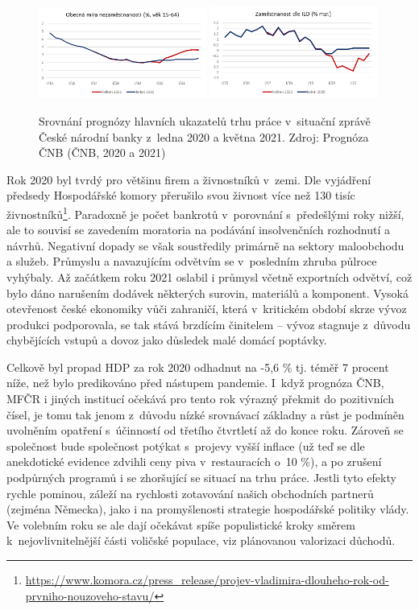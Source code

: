 \begin{figure}[ht]
    \centering
    \includegraphics[width=0.49\textwidth]{./pic/nezamestnanost.png} \includegraphics[width=0.49\textwidth]{./pic/zamestnanost.png}
    \caption{Srovnání prognózy hlavních ukazatelů trhu práce v~situační zprávě České národní banky z~ledna 2020 a května 2021. Zdroj: Prognóza ČNB (ČNB, 2020 a 2021)}
    \label{fig:110-trhprace}
\end{figure}

Rok 2020 byl tvrdý pro většinu firem a živnostníků v~zemi. Dle vyjádření předsedy Hospodářské komory přerušilo svou živnost více než 130 tisíc živnostníků\footnote{\url{https://www.komora.cz/press_release/projev-vladimira-dlouheho-rok-od-prvniho-nouzoveho-stavu/}}. Paradoxně je počet bankrotů v~porovnání s~předešlými roky nižší, ale to souvisí se zavedením moratoria na podávání insolvenčních rozhodnutí a návrhů. Negativní dopady se však soustředily primárně na sektory maloobchodu a služeb. Průmyslu a navazujícím odvětvím se v~posledním zhruba půlroce vyhýbaly. Až začátkem roku 2021 oslabil i průmysl včetně exportních odvětví, což bylo dáno narušením dodávek některých surovin, materiálů a komponent. Vysoká otevřenost české ekonomiky vůči zahraničí, která v~kritickém období skrze vývoz produkci podporovala, se tak stává brzdícím činitelem – vývoz stagnuje z~důvodu chybějících vstupů a dovoz jako důsledek malé domácí poptávky.

Celkově byl propad HDP za rok 2020 odhadnut na -5,6 \% tj. téměř 7 procent níže, než bylo predikováno před nástupem pandemie. I~když prognóza ČNB, MFČR i jiných institucí očekává pro tento rok výrazný překmit do pozitivních čísel, je tomu tak jenom z~důvodu nízké srovnávací základny a růst je podmíněn uvolněním opatření s~účinností od třetího čtvrtletí až do konce roku. Zároveň se společnost bude společnost potýkat s~projevy vyšší inflace (už teď se dle anekdotické evidence zdvihli ceny piva v~restauracích o~10 \%), a po zrušení podpůrných programů i se zhoršující se situací na trhu práce. Jestli tyto efekty rychle pominou, záleží na rychlosti zotavování našich obchodních partnerů (zejména Německa), jako i na promyšlenosti strategie hospodářské politiky vlády. Ve volebním roku se ale dají očekávat spíše populistické kroky směrem k~nejovlivnitelnější části voličské populace, viz plánovanou valorizaci důchodů.

